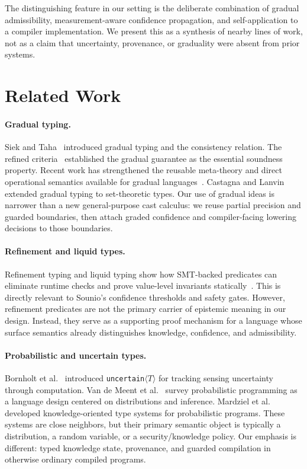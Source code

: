 \documentclass[acmsmall,screen,review,anonymous]{acmart}
\begin{document}
The distinguishing feature in our setting is the deliberate combination of
gradual admissibility, measurement-aware confidence propagation, and
self-application to a compiler implementation.
We present this as a synthesis of nearby lines of work, not as a claim that
uncertainty, provenance, or graduality were absent from prior systems.

\section{Related Work}
\label{sec:related}

\paragraph{Gradual typing.}
Siek and Taha~\cite{siek2006gradual} introduced gradual typing and the
consistency relation.
The refined criteria~\cite{siek2015refined} established the gradual
guarantee as the essential soundness property.
Recent work has strengthened the reusable meta-theory and direct operational
semantics available for gradual languages~\cite{siek2021parameterized,ye2024tdos}.
Castagna and Lanvin~\cite{castagna2017gradual} extended gradual typing
to set-theoretic types.
Our use of gradual ideas is narrower than a new general-purpose cast calculus:
we reuse partial precision and guarded boundaries, then attach graded
confidence and compiler-facing lowering decisions to those boundaries.

\paragraph{Refinement and liquid types.}
Refinement typing and liquid typing show how SMT-backed predicates can
eliminate runtime checks and prove value-level invariants
statically~\cite{rondon2008liquid}.
This is directly relevant to Sounio's confidence thresholds and safety gates.
However, refinement predicates are not the primary carrier of epistemic
meaning in our design.
Instead, they serve as a supporting proof mechanism for a language whose
surface semantics already distinguishes knowledge, confidence, and
admissibility.

\paragraph{Probabilistic and uncertain types.}
Bornholt et al.~\cite{bornholt2014uncertain} introduced \texttt{uncertain$\langle T \rangle$}
for tracking sensing uncertainty through computation.
Van de Meent et al.~\cite{vandemeent2021pp} survey probabilistic programming
as a language design centered on distributions and inference.
Mardziel et al.~\cite{mardziel2011knowledge} developed knowledge-oriented
type systems for probabilistic programs.
These systems are close neighbors, but their primary semantic object is
typically a distribution, a random variable, or a security/knowledge policy.
Our emphasis is different: typed knowledge state, provenance, and guarded
compilation in otherwise ordinary compiled programs.
\end{document}
